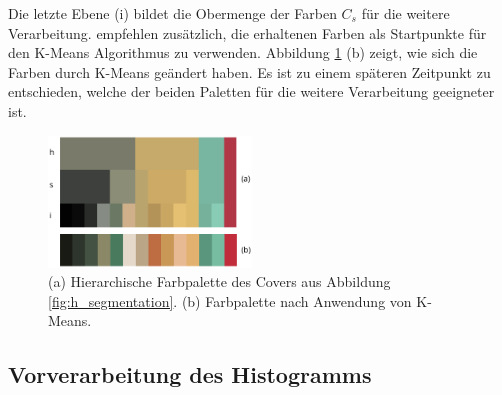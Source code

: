 Die letzte Ebene (i) bildet die Obermenge der Farben $C_s$ für die weitere Verarbeitung. \citet{acopa} empfehlen zusätzlich, die erhaltenen Farben als Startpunkte für den K-Means Algorithmus zu verwenden. Abbildung \ref{fig:palette} (b) zeigt, wie sich die Farben durch K-Means geändert haben. Es ist zu einem späteren Zeitpunkt zu entschieden, welche der beiden Paletten für die weitere Verarbeitung geeigneter ist.

\begin{figure}[h]
\centering
\includegraphics[width=0.48\textwidth]{img/palette.png}
\caption{(a) Hierarchische Farbpalette des Covers aus Abbildung \ref{fig:h_segmentation}. (b) Farbpalette nach Anwendung von K-Means.}
\label{fig:palette}
\end{figure}

\subsection{Vorverarbeitung des Histogramms}
\label{sec:vorverarbeitung}


